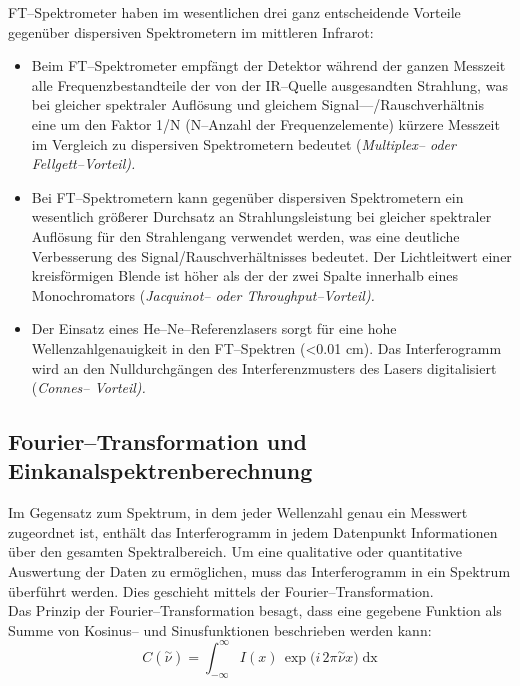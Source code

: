 FT--Spektrometer haben im wesentlichen drei ganz entscheidende
Vorteile gegenüber dispersiven Spektrometern im mittleren
Infrarot:
\begin{itemize}
  \item Beim FT--Spektrometer empfängt der Detektor während der
  ganzen Messzeit alle Frequenzbestandteile der von der IR--Quelle
  ausgesandten Strahlung, was bei gleicher spektraler Auflösung
  und gleichem Signal---/Rauschverhältnis eine um den Faktor 1/N
  (N--Anzahl der Frequenzelemente) kürzere Messzeit im Vergleich zu dispersiven Spektrometern
  bedeutet (\it Multiplex-- \rm oder \it Fellgett--\rm Vorteil).
  \item Bei FT--Spektrometern kann gegenüber dispersiven Spektrometern ein wesentlich grö{\ss}erer
  Durchsatz an Strahlungsleistung bei gleicher spektraler
  Auflösung für den Strahlengang verwendet werden, was eine
  deutliche Verbesserung des Signal/Rauschverhältnisses
  bedeutet. Der Lichtleitwert \cite{schrader95} einer kreisförmigen Blende ist höher
  als der der zwei Spalte innerhalb eines Monochromators
  (\it Jacquinot-- \rm oder \it Throughput--\rm Vorteil).
  \item Der Einsatz eines He--Ne--Referenzlasers sorgt für eine
  hohe Wellenzahlgenauigkeit in den FT--Spektren (<0.01
  cm). Das Interferogramm wird an den Nulldurchgängen des
  Interferenzmusters des Lasers digitalisiert (\it Connes--\rm
  Vorteil).
\end{itemize}



\subsection{\label{ft}Fourier--Transformation und Einkanalspektrenberechnung}

Im Gegensatz zum Spektrum, in dem jeder Wellenzahl genau ein
Messwert zugeordnet ist, enthält das Interferogramm in jedem
Datenpunkt Informationen über den gesamten Spektralbereich. Um
eine qualitative oder quantitative Auswertung der Daten zu
ermöglichen, muss das Interferogramm in ein Spektrum überführt
werden. Dies geschieht mittels der Fourier--Transformation.\\

Das Prinzip der Fourier--Transformation besagt, dass eine gegebene
Funktion als Summe von Kosinus-- und Sinusfunktionen beschrieben
werden kann:
\begin{equation}\label{eqft}
  C(\stackrel{\sim}{\nu})= \int_{-\infty}^{\infty} I(x)\,
  \exp{(i\,2\pi \stackrel{\sim}{\nu} x})\; \text{dx}
\end{equation}

